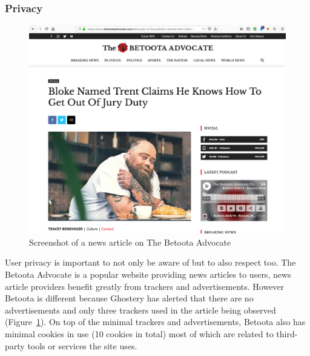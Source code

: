 \subsubsection{Privacy}
\begin{figure}[H]
	\centering
	\includegraphics[width=0.7\linewidth]{betoota}
	\caption{Screenshot of a news article on The Betoota Advocate}\label{fig:betoota}
\end{figure}
User privacy is important to not only be aware of but to also respect too. The Betoota Advocate is a popular website providing news articles to users, news article providers benefit greatly from trackers and advertisements. However Betoota is different because Ghostery has alerted that there are no advertisements and only three trackers used in the article being observed (Figure~\ref{fig:betoota}). On top of the minimal trackers and advertisements, Betoota also has minimal cookies in use (10 cookies in total) most of which are related to third-party tools or services the site uses.

